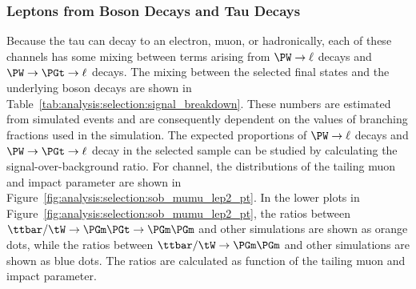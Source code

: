 \subsubsection{Leptons from Boson Decays and Tau Decays} 
Because the tau can decay to an electron, muon, or hadronically, each of these channels has some mixing between terms arising from $\PW\rightarrow\ell$ decays and $\PW\rightarrow\PGt\rightarrow\ell$ decays.  The mixing between the selected final states and the underlying \PW boson decays are shown in Table~\ref{tab:analysis:selection:signal_breakdown}. These numbers are estimated from simulated \ttbar events and are consequently dependent on the values of branching fractions used in the simulation. The expected proportions of $\PW\rightarrow\ell$ decays and $\PW\rightarrow\PGt\rightarrow\ell$ decay in the selected sample can be studied by calculating the signal-over-background ratio. For \cmm channel, the distributions of the tailing muon \pt and impact parameter are shown in Figure~\ref{fig:analysis:selection:sob_mumu_lep2_pt}. In the lower plots in Figure~\ref{fig:analysis:selection:sob_mumu_lep2_pt}, the ratios between $\ttbar/\tW \to \PGm \PGt \to \PGm \PGm$ and other simulations are shown as orange dots, while the ratios between $\ttbar/\tW \to \PGm \PGm$ and other simulations are shown as blue dots. The ratios are calculated as function of the tailing muon \pt and impact parameter.

